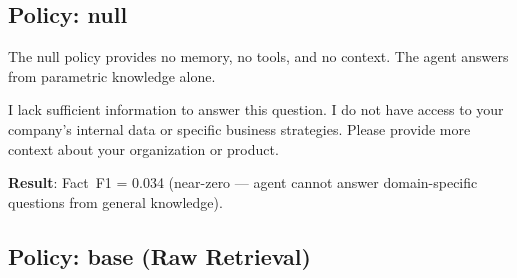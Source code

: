 \documentclass[11pt,a4paper]{article}
\begin{document}
\subsection{Policy: null}

\begin{center}
\end{center}

The null policy provides no memory, no tools, and no context. The agent answers from parametric knowledge alone.

\begin{tracebox}[title=null --- Agent Answer (0 tool calls)]
\small
I lack sufficient information to answer this question. I do not have access to your company's internal data or specific business strategies. Please provide more context about your organization or product.
\end{tracebox}

\textbf{Result}: Fact~F1 = 0.034 (near-zero --- agent cannot answer domain-specific questions from general knowledge).

\subsection{Policy: base (Raw Retrieval)}
\end{document}
